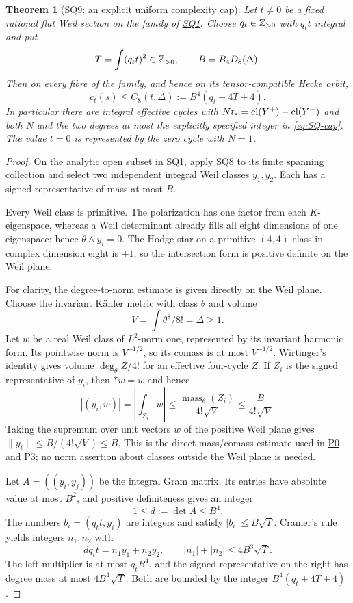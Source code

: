 \documentclass[11pt,a4paper]{article}
\newtheorem{theorem}{Theorem}[section]
\theoremstyle{definition}\newtheorem{definition}[theorem]{Definition}
\theoremstyle{remark}\newtheorem{remark}[theorem]{Remark}
\newcommand{\findingref}[1]{\hyperref[#1]{\textsf{#1}}}
\begin{document}
\begin{theorem}[SQ9: an explicit uniform complexity cap]\label{SQ9}
Let $t\ne0$ be a fixed rational flat Weil section on the family of \findingref{SQ1}. Choose $q_t\in\mathbb Z_{>0}$ with $q_tt$ integral and put
\[
 T=\int(q_tt)^2\in\mathbb Z_{>0},\qquad
 B=B_4D_8(\Delta).
\]
Then on every fibre of the family, and hence on its tensor-compatible Hecke orbit,
\begin{equation}\label{eq:SQ-cap}
 c_t(s)\le C_8(t,\Delta):=B^4(q_t+4T+4).
\end{equation}
In particular there are integral effective cycles with $Nt_s=\operatorname{cl}(Y^+)-\operatorname{cl}(Y^-)$ and both $N$ and the two degrees at most the explicitly specified integer in \eqref{eq:SQ-cap}. The value $t=0$ is represented by the zero cycle with $N=1$.
\end{theorem}
\begin{proof}
On the analytic open subset in \findingref{SQ1}, apply \findingref{SQ8} to its finite spanning collection and select two independent integral Weil classes $y_1,y_2$. Each has a signed representative of mass at most $B$.

Every Weil class is primitive. The polarization has one factor from each $K$-eigenspace, whereas a Weil determinant already fills all eight dimensions of one eigenspace; hence $\theta\wedge y_i=0$. The Hodge star on a primitive $(4,4)$-class in complex dimension eight is $+1$, so the intersection form is positive definite on the Weil plane.

For clarity, the degree-to-norm estimate is given directly on the Weil plane. Choose the invariant K\"ahler metric with class $\theta$ and volume
\[
 V=\int\theta^8/8!=\Delta\ge1.
\]
Let $w$ be a real Weil class of $L^2$-norm one, represented by its invariant harmonic form. Its pointwise norm is $V^{-1/2}$, so its comass is at most $V^{-1/2}$. Wirtinger's identity gives volume $\deg_\theta Z/4!$ for an effective four-cycle $Z$. If $Z_i$ is the signed representative of $y_i$, then $*w=w$ and hence
\[
 |(y_i,w)|=\left|\int_{Z_i}w\right|
 \le\frac{\operatorname{mass}_\theta(Z_i)}{4!\sqrt V}
 \le\frac{B}{4!\sqrt V}.
\]
Taking the supremum over unit vectors $w$ of the positive Weil plane gives $\|y_i\|\le B/(4!\sqrt V)\le B$. This is the direct mass/comass estimate used in \findingref{P0} and \findingref{P3}; no norm assertion about classes outside the Weil plane is needed.

Let $A=((y_i,y_j))$ be the integral Gram matrix. Its entries have absolute value at most $B^2$, and positive definiteness gives an integer
\[
 1\le d:=\det A\le B^4.
\]
The numbers $b_i=(q_tt,y_i)$ are integers and satisfy $|b_i|\le B\sqrt T$. Cramer's rule yields integers $n_1,n_2$ with
\[
 d q_tt=n_1y_1+n_2y_2,
 \qquad |n_1|+|n_2|\le4B^3\sqrt T.
\]
The left multiplier is at most $q_tB^4$, and the signed representative on the right has degree mass at most $4B^4\sqrt T$. Both are bounded by the integer $B^4(q_t+4T+4)$.


\end{proof}
\end{document}
